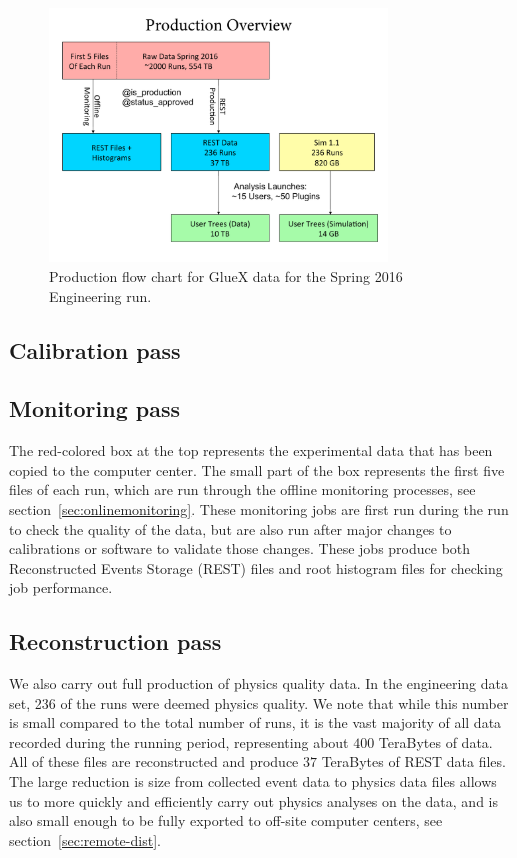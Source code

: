 \begin{figure}[h!]\centering
\includegraphics[width=0.8\textwidth]{figures/Production_Spring_2016.pdf}
\caption[]{\label{fig:production_overview}Production flow chart for GlueX data for the Spring 2016 
Engineering run.} 
\end{figure}

\subsection{Calibration pass \label{sec:reccalibration}}


\subsection{Monitoring pass \label{sec:recmonitoring}}

The red-colored box at the top
represents the experimental data that has been copied to the computer center. The small part of the box represents the first five files of each run, which are run through the offline monitoring processes, see section~\ref{sec:onlinemonitoring}. These monitoring jobs are first run during the run to check the quality of the data, but are also run after major changes to calibrations or software to validate those changes. These jobs produce both Reconstructed Events Storage (REST) files and root histogram files for checking job performance.

\subsection{Reconstruction pass \label{sec:recreconstruction}}

We also carry out full production of physics quality data. In the engineering data set, 236 of the
runs were deemed physics quality. We note that while this number is small compared to the total number of runs, it is the vast majority of all data recorded during the running period, 
representing about $400$ TeraBytes of data. All of these files are reconstructed and produce $37$ TeraBytes of REST data files. The large reduction is size from collected event data to physics data files allows us to  more quickly and efficiently carry out physics analyses on the data, and is also small enough to be fully exported to off-site computer centers, see section~\ref{sec:remote-dist}.

